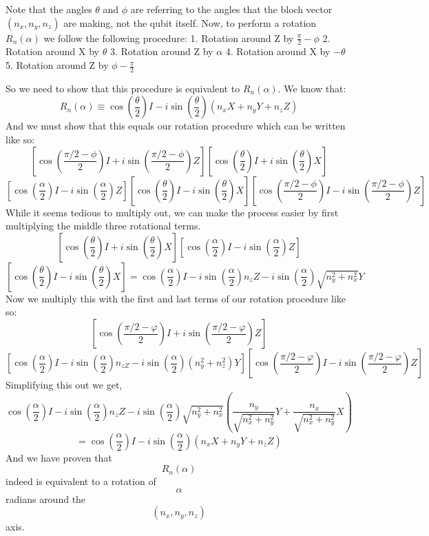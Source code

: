 Note that the angles $\theta$ and $\phi$ are referring to the angles that the bloch vector $(n_x, n_y, n_z)$ are making, not the qubit itself. Now, to perform a rotation $R_n(\alpha)$ we follow the following procedure:
1. Rotation around Z by $\frac{\pi}{2} - \phi$
2. Rotation around X by $\theta$
3. Rotation around Z by $\alpha$
4. Rotation around X  by $-\theta$
5. Rotation around Z by $\phi - \frac{\pi}{2}$


So we need to show that this procedure is equivalent to $R_n(\alpha)$. We know that:
$$R_n(\alpha) \equiv \cos(\frac{\theta}{2})I - i\sin(\frac{\theta}{2})(n_xX + n_yY + n_zZ)$$
And we must show that this equals our rotation procedure which can be written like so:
$$\left[ \cos\left( \frac{\pi /2 - \phi}{2}\right)I + i\sin\left( \frac{\pi /2 - \phi}{2}\right) Z \right]\left[ \cos\left( \frac{\theta}{2}\right)I +  i\sin\left( \frac{\theta}{2}\right) X \right]$$
$$\left[ \cos\left( \frac{\alpha}{2}\right)I - i\sin\left( \frac{\alpha}{2}\right) Z \right]\left[ \cos\left( \frac{\theta}{2}\right)I - i\sin\left( \frac{\theta}{2}\right) X \right]\left[ \cos\left( \frac{\pi /2 - \phi}{2}\right)I - i\sin\left( \frac{\pi /2 - \phi}{2}\right) Z \right]$$
While it seems tedious to multiply out, we can make the process easier by first multiplying the middle three rotational terms. 
$$\left[ \cos\left( \frac{\theta}{2}\right)I + i\sin\left( \frac{\theta}{2}\right) X \right]\left[ \cos\left( \frac{\alpha}{2}\right)I - i\sin\left( \frac{\alpha}{2}\right) Z \right]$$
$$\left[ \cos\left( \frac{\theta}{2}\right)I - i\sin\left( \frac{\theta}{2}\right) X \right]= \cos\left(\frac{\alpha}{2} \right )I - i\sin\left(\frac{\alpha}{2} \right )n_zZ - i\sin\left(\frac{\alpha}{2} \right ) \sqrt{n_y^2 + n_x^2}Y$$
Now we multiply this with the first and last terms of our rotation procedure like so:
$$\left[ \cos\left( \frac{\pi /2 - \varphi}{2}\right)I + i\sin\left( \frac{\pi /2 - \varphi}{2}\right) Z \right]$$
$$\left[  \cos\left(\frac{\alpha}{2} \right )I - i\sin\left(\frac{\alpha}{2} \right )n_{zZ}- i\sin\left(\frac{\alpha}{2} \right ) (n_y^2 + n_z^2)Y \right]\left[ \cos\left( \frac{\pi /2 - \varphi}{2}\right)I - i\sin\left( \frac{\pi /2 - \varphi}{2}\right) Z \right]$$
Simplifying this out we get,
$$\cos\left(\frac{\alpha}{2} \right )I - i\sin\left(\frac{\alpha}{2} \right )n_zZ- i\sin\left(\frac{\alpha}{2} \right ) \sqrt{n_y^2 + n_x^2}(\frac{n_y}{\sqrt{n_x^2 + n_y^2}}Y + \frac{n_x}{\sqrt{n_x^2 + n_y^2}}X)$$
$$= \cos\left(\frac{\alpha}{2} \right )I - i\sin\left(\frac{\alpha}{2} \right )(n_xX + n_yY + n_zZ)$$
And we have proven that $$R_n(\alpha)$$ indeed is equivalent to a rotation of $$\alpha$$ radians around the $$(n_x, n_y, n_z)$$ axis.


